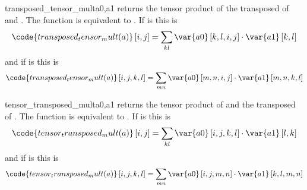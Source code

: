 \begin{funcdesc}{transposed_tensor_mult}{a0,a1}
returns the tensor product of the transposed of  and . The function is equivalent to
.
If  is \RankTwo this is
\begin{equation}
\code{transposed_tensor_mult(a)}\left[i,j\right]=\sum_{kl}\var{a0}\left[k,l,i,j\right] \cdot \var{a1} \left[k,l\right]
\end{equation}
and if  is \RankFour this is
\begin{equation}
\code{transposed_tensor_mult(a)}\left[i,j,k,l\right]=\sum_{mn}\var{a0} \left[m,n,i,j\right] \cdot \var{a1} \left[m,n,k,l\right]
\end{equation}
\end{funcdesc}

\begin{funcdesc}{tensor_transposed_mult}{a0,a1}
returns the tensor product of  and the transposed of .
The function is equivalent to
.
If  is \RankTwo this is
\begin{equation}
\code{tensor_transposed_mult(a)}\left[i,j\right]=\sum_{kl}\var{a0}\left[i,j,k,l\right] \cdot \var{a1} \left[l,k\right]
\end{equation}
and if  is \RankFour this is
\begin{equation}
\code{tensor_transposed_mult(a)}\left[i,j,k,l\right]=\sum_{mn}\var{a0} \left[i,j,m,n\right] \cdot \var{a1} \left[k,l,m,n\right]
\end{equation}
\end{funcdesc}

